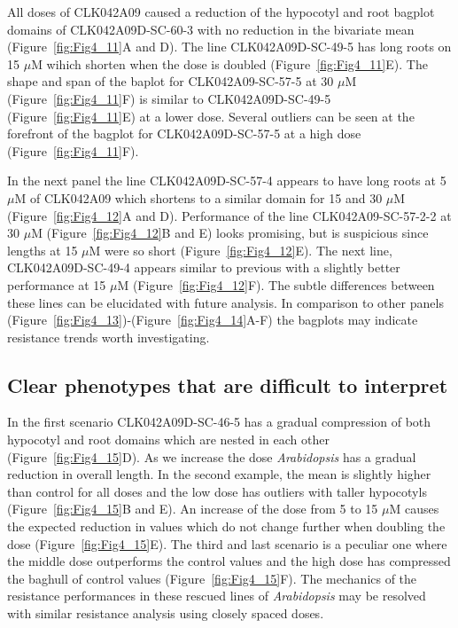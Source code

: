 All doses of CLK042A09 caused a reduction of the hypocotyl and root bagplot domains of CLK042A09D-SC-60-3 with no reduction in the bivariate mean (Figure~\ref{fig:Fig4_11}A and D). The line CLK042A09D-SC-49-5 has long roots on 15 $\mu$M wihich shorten when the dose is doubled (Figure~\ref{fig:Fig4_11}E). The shape and span of the baplot for CLK042A09-SC-57-5 at 30 $\mu$M (Figure~\ref{fig:Fig4_11}F) is similar to CLK042A09D-SC-49-5 (Figure~\ref{fig:Fig4_11}E) at a lower dose. Several outliers can be seen at the forefront of the bagplot for CLK042A09D-SC-57-5 at a high dose (Figure~\ref{fig:Fig4_11}F). 

In the next panel the line CLK042A09D-SC-57-4 appears to have long roots at 5 $\mu$M of CLK042A09 which shortens to a similar domain for 15 and 30 $\mu$M (Figure~\ref{fig:Fig4_12}A and D). Performance of the line CLK042A09-SC-57-2-2 at 30 $\mu$M (Figure~\ref{fig:Fig4_12}B and E) looks promising, but is suspicious since lengths at 15 $\mu$M were so short (Figure~\ref{fig:Fig4_12}E). The next line, CLK042A09D-SC-49-4 appears similar to previous with a slightly better performance at 15 $\mu$M (Figure~\ref{fig:Fig4_12}F). The subtle differences between these lines can be elucidated with future analysis. In comparison to other panels (Figure~\ref{fig:Fig4_13})-(Figure~\ref{fig:Fig4_14}A-F) the bagplots may indicate resistance trends worth investigating. 

\subsection{Clear phenotypes that are difficult to interpret}

In the first scenario CLK042A09D-SC-46-5 has a gradual compression of both hypocotyl and root domains which are nested in each other (Figure~\ref{fig:Fig4_15}D). As we increase the dose {\it Arabidopsis} has a gradual reduction in overall length. In the second example, the mean is slightly higher than control for all doses and the low dose has outliers with taller hypocotyls (Figure~\ref{fig:Fig4_15}B and E). An increase of the dose from 5 to 15 $\mu$M causes the expected reduction in values which do not change further when doubling the dose (Figure~\ref{fig:Fig4_15}E). The third and last scenario is a peculiar one where the middle dose outperforms the control values and the high dose has compressed the baghull of control values (Figure~\ref{fig:Fig4_15}F). The mechanics of the resistance performances in these rescued lines of {\it Arabidopsis} may be resolved with similar resistance analysis using closely spaced doses. 

